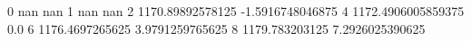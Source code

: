 0 nan nan
1 nan nan
2 1170.89892578125 -1.5916748046875
4 1172.4906005859375 0.0
6 1176.4697265625 3.9791259765625
8 1179.783203125 7.2926025390625
